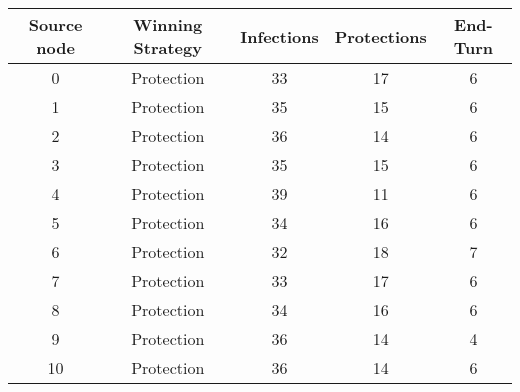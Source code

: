 \documentclass[results.tex]{subfiles}
\begin{document}
    \begin{center}
        \begin{tabular}{| c || c | c | c | c |}
            \hline
            {\bfseries Source node} & {\bfseries Winning Strategy} & {\bfseries Infections} & {\bfseries Protections}
            & {\bfseries End-Turn}
            \\  %
            \hline\hline
            0                       & Protection                   & 33                     & 17                      & 6                    \\
            \hline
            1                       & Protection                   & 35                     & 15                      & 6                    \\
            \hline
            2                       & Protection                   & 36                     & 14                      & 6                    \\
            \hline
            3                       & Protection                   & 35                     & 15                      & 6                    \\
            \hline
            4                       & Protection                   & 39                     & 11                      & 6                    \\
            \hline
            5                       & Protection                   & 34                     & 16                      & 6                    \\
            \hline
            6                       & Protection                   & 32                     & 18                      & 7                    \\
            \hline
            7                       & Protection                   & 33                     & 17                      & 6                    \\
            \hline
            8                       & Protection                   & 34                     & 16                      & 6                    \\
            \hline
            9                       & Protection                   & 36                     & 14                      & 4                    \\
            \hline
            10                      & Protection                   & 36                     & 14                      & 6                    \\

\end{tabular}
\end{center}
\end{document}
